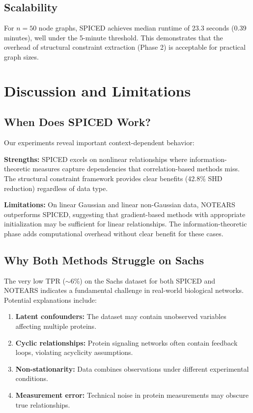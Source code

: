 \documentclass{article}
\begin{document}
\subsection{Scalability}

For $n=50$ node graphs, SPICED achieves median runtime of 23.3 seconds (0.39 minutes), well under the 5-minute threshold. This demonstrates that the overhead of structural constraint extraction (Phase 2) is acceptable for practical graph sizes.

\section{Discussion and Limitations}

\subsection{When Does SPICED Work?}

Our experiments reveal important context-dependent behavior:

\textbf{Strengths:} SPICED excels on nonlinear relationships where information-theoretic measures capture dependencies that correlation-based methods miss. The structural constraint framework provides clear benefits (42.8\% SHD reduction) regardless of data type.

\textbf{Limitations:} On linear Gaussian and linear non-Gaussian data, NOTEARS outperforms SPICED, suggesting that gradient-based methods with appropriate initialization may be sufficient for linear relationships. The information-theoretic phase adds computational overhead without clear benefit for these cases.

\subsection{Why Both Methods Struggle on Sachs}

The very low TPR ($\sim$6\%) on the Sachs dataset for both SPICED and NOTEARS indicates a fundamental challenge in real-world biological networks. Potential explanations include:
\begin{enumerate}
    \item \textbf{Latent confounders:} The dataset may contain unobserved variables affecting multiple proteins.
    \item \textbf{Cyclic relationships:} Protein signaling networks often contain feedback loops, violating acyclicity assumptions.
    \item \textbf{Non-stationarity:} Data combines observations under different experimental conditions.
    \item \textbf{Measurement error:} Technical noise in protein measurements may obscure true relationships.
\end{enumerate}
\end{document}
